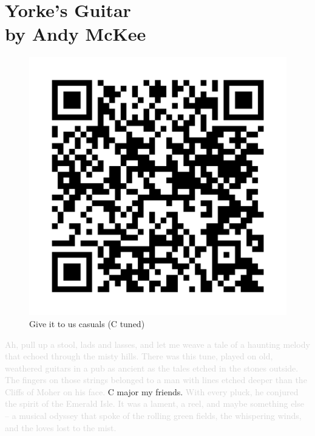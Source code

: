 \chapter[Yorke's Guitar]{Yorke's Guitar\\[1ex]\large{by Andy McKee}}

\begin{figure}
\includegraphics[width=1\linewidth]{QR_Codes/QR_Yorkers_C.png}\\
Give it to us casuals (C tuned)
\end{figure}

\textcolor{lightgray}{Ah, pull up a stool, lads and lasses, and let me weave a tale of a haunting melody that echoed through the misty hills. There was this tune, played on old, weathered guitars in a pub as ancient as the tales etched in the stones outside. The fingers on those strings belonged to a man with lines etched deeper than the Cliffs of Moher on his face.} C major my friends. \textcolor{lightgray}{With every pluck, he conjured the spirit of the Emerald Isle. It was a lament, a reel, and maybe something else – a musical odyssey that spoke of the rolling green fields, the whispering winds, and the loves lost to the mist.}\\

